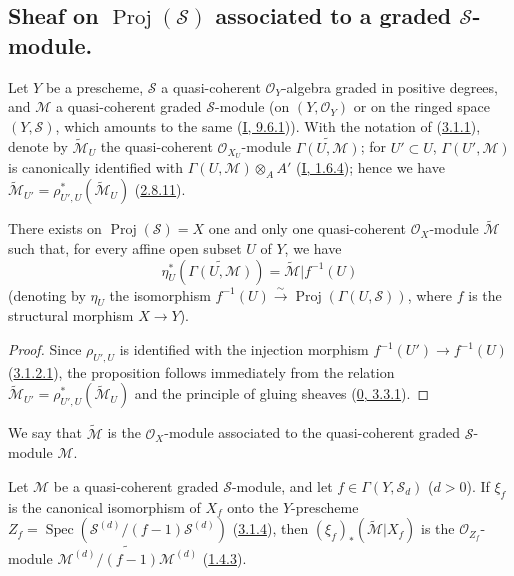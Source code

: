 \subsection{Sheaf on $\operatorname{Proj}(\mathcal{S})$ associated to a
graded $\mathcal{S}$-module.}
\label{subsection:II.3.2}

\begin{env}[3.2.1]
\label{II.3.2.1}
Let $Y$ be a prescheme, $\mathcal{S}$ a quasi-coherent $\mathcal{O}_Y$-algebra
graded in positive degrees, and $\mathcal{M}$ a quasi-coherent graded
$\mathcal{S}$-module (on $(Y,\mathcal{O}_Y)$ or on the ringed space
$(Y,\mathcal{S})$, which amounts to the same
(\hyperref[I.9.6.1]{I, 9.6.1})). With the notation of
(\hyperref[II.3.1.1]{3.1.1}), denote by $\widetilde{\mathcal{M}}_U$ the
quasi-coherent $\mathcal{O}_{X_U}$-module
$\widetilde{\Gamma(U,\mathcal{M})}$; for $U'\subset U$,
$\Gamma(U',\mathcal{M})$ is canonically identified with
$\Gamma(U,\mathcal{M})\otimes_A A'$ (\hyperref[I.1.6.4]{I, 1.6.4}); hence
we have $\widetilde{\mathcal{M}}_{U'}
=\rho_{U',U}^*(\widetilde{\mathcal{M}}_U)$
(\hyperref[II.2.8.11]{2.8.11}).
\end{env}

\begin{proposition}[3.2.2]
\label{II.3.2.2}
There exists on $\operatorname{Proj}(\mathcal{S})=X$ one and only one
quasi-coherent $\mathcal{O}_X$-module $\widetilde{\mathcal{M}}$ such that,
for every affine open subset $U$ of $Y$, we have
\[
  \eta_U^*(\widetilde{\Gamma(U,\mathcal{M})})
  =\widetilde{\mathcal{M}}|f^{-1}(U)
\]
(denoting by $\eta_U$ the isomorphism
$f^{-1}(U)\xrightarrow{\sim}\operatorname{Proj}(\Gamma(U,\mathcal{S}))$, where
$f$ is the structural morphism $X\to Y$).
\end{proposition}

\begin{proof}
Since $\rho_{U',U}$ is identified with the injection morphism
$f^{-1}(U')\to f^{-1}(U)$ (\hyperref[II.3.1.2.1]{3.1.2.1}), the
proposition follows immediately from the relation
$\widetilde{\mathcal{M}}_{U'}=\rho_{U',U}^*(\widetilde{\mathcal{M}}_U)$ and
the principle of gluing sheaves (\hyperref[0.3.3.1]{0, 3.3.1}).
\end{proof}

We say that $\widetilde{\mathcal{M}}$ is the $\mathcal{O}_X$-module associated
to the quasi-coherent graded $\mathcal{S}$-module $\mathcal{M}$.

\begin{proposition}[3.2.3]
\label{II.3.2.3}
Let $\mathcal{M}$ be a quasi-coherent graded $\mathcal{S}$-module, and let
$f\in\Gamma(Y,\mathcal{S}_d)$ ($d>0$). If $\xi_f$ is the canonical isomorphism
of $X_f$ onto the $Y$-prescheme
$Z_f=\operatorname{Spec}(\mathcal{S}^{(d)}/(f-1)\mathcal{S}^{(d)})$
(\hyperref[II.3.1.4]{3.1.4}), then $(\xi_f)_*(\widetilde{\mathcal{M}}|X_f)$
is the $\mathcal{O}_{Z_f}$-module
$\widetilde{\mathcal{M}^{(d)}/(f-1)\mathcal{M}^{(d)}}$
(\hyperref[II.1.4.3]{1.4.3}).
\end{proposition}

